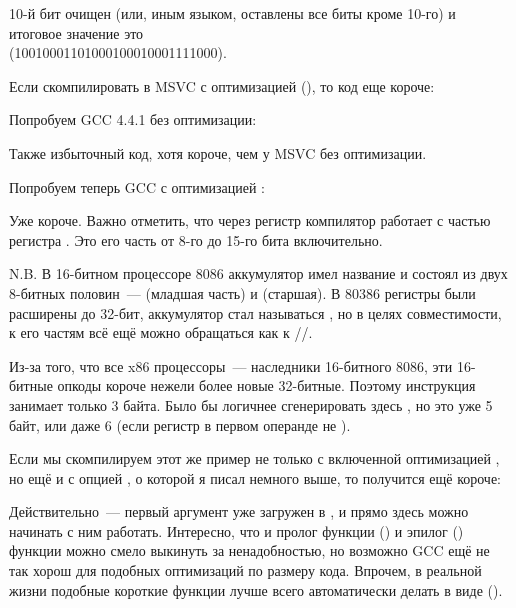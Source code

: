 10-й бит очищен (или, иным языком, оставлены все биты кроме 10-го) и итоговое значение это \\
 (1001000110100010001{\color{red}0}001111000).


Если скомпилировать в MSVC с оптимизацией (\Ox), то код еще короче:




Попробуем GCC 4.4.1 без оптимизации:



Также избыточный код, хотя короче, чем у MSVC без оптимизации.

Попробуем теперь GCC с оптимизацией \Othree:




Уже короче. Важно отметить, что через регистр \AH компилятор работает с частью регистра \EAX. 
Это его часть от 8-го до 15-го бита включительно.


N.B. В 16-битном процессоре 8086 аккумулятор имел название \AX 
и состоял из двух 8-битных половин~--- \AL (младшая часть) и \AH (старшая). 
В 80386 регистры были расширены до 32-бит, 
аккумулятор стал называться \EAX, но в целях совместимости, к его  частям всё ещё можно 
обращаться как к \AX/\AH/\AL.

Из-за того, что все x86 процессоры~--- наследники 16-битного 8086, эти  16-битные опкоды короче 
нежели более новые 32-битные. 
Поэтому инструкция  занимает только 3 байта. 
Было бы логичнее сгенерировать здесь , но это уже 5 байт, или даже 6 
(если регистр в первом операнде не \EAX).


Если мы скомпилируем этот же пример не только с включенной оптимизацией \Othree, 
но ещё и с опцией , о которой я писал немного выше, то получится ещё короче:



Действительно~--- первый аргумент уже загружен в \EAX, и прямо здесь можно начинать с ним работать. 
Интересно, что и пролог функции () и эпилог () 
функции можно смело выкинуть за ненадобностью, 
но возможно GCC ещё не так хорош для подобных оптимизаций по размеру кода. 
Впрочем, в реальной жизни подобные короткие функции лучше всего автоматически делать в виде 
 ().

